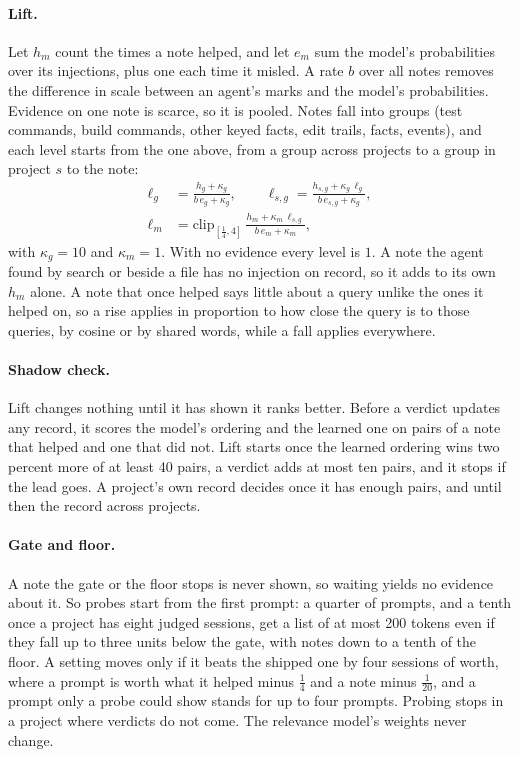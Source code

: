 \paragraph{Lift.} Let $h_m$ count the times a note helped, and let $e_m$ sum the model's probabilities over its injections, plus one each time it misled. A rate $b$ over all notes removes the difference in scale between an agent's marks and the model's probabilities. Evidence on one note is scarce, so it is pooled. Notes fall into groups (test commands, build commands, other keyed facts, edit trails, facts, events), and each level starts from the one above, from a group across projects to a group in project $s$ to the note:
\begin{align*}
\ell_g&=\frac{h_g+\kappa_g}{b\,e_g+\kappa_g},\qquad \ell_{s,g}=\frac{h_{s,g}+\kappa_g\,\ell_g}{b\,e_{s,g}+\kappa_g},\\
\ell_m&=\mathrm{clip}_{[\frac14,4]}\,\frac{h_m+\kappa_m\,\ell_{s,g}}{b\,e_m+\kappa_m},
\end{align*}
with $\kappa_g=10$ and $\kappa_m=1$. With no evidence every level is $1$. A note the agent found by search or beside a file has no injection on record, so it adds to its own $h_m$ alone. A note that once helped says little about a query unlike the ones it helped on, so a rise applies in proportion to how close the query is to those queries, by cosine or by shared words, while a fall applies everywhere.

\paragraph{Shadow check.} Lift changes nothing until it has shown it ranks better. Before a verdict updates any record, it scores the model's ordering and the learned one on pairs of a note that helped and one that did not. Lift starts once the learned ordering wins two percent more of at least 40 pairs, a verdict adds at most ten pairs, and it stops if the lead goes. A project's own record decides once it has enough pairs, and until then the record across projects.

\paragraph{Gate and floor.} A note the gate or the floor stops is never shown, so waiting yields no evidence about it. So probes start from the first prompt: a quarter of prompts, and a tenth once a project has eight judged sessions, get a list of at most 200 tokens even if they fall up to three units below the gate, with notes down to a tenth of the floor. A setting moves only if it beats the shipped one by four sessions of worth, where a prompt is worth what it helped minus $\frac14$ and a note minus $\frac1{20}$, and a prompt only a probe could show stands for up to four prompts. Probing stops in a project where verdicts do not come. The relevance model's weights never change.

